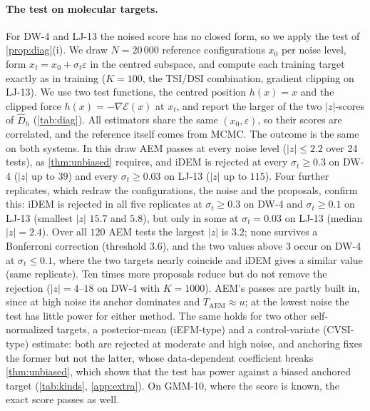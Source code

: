 \paragraph{The test on molecular targets.}
For DW-4 and LJ-13 the noised score has no closed form, so we apply the test of \cref{prop:diag}(i). We draw $N=20\,000$ reference configurations $x_0$ per noise level, form $x_t=x_0+\sigma_t\varepsilon$ in the centred subspace, and compute each training target exactly as in training ($K=100$, the TSI/DSI combination, gradient clipping on LJ-13). We use two test functions, the centred position $h(x)=x$ and the clipped force $h(x)=-\nabla\mathcal{E}(x)$ at $x_t$, and report the larger of the two $|z|$-scores of $\widehat D_h$ (\cref{tab:diag}). All estimators share the same $(x_0,\varepsilon)$, so their scores are correlated, and the reference itself comes from MCMC.
The outcome is the same on both systems. In this draw AEM passes at every noise level ($|z|\le2.2$ over 24 tests), as \cref{thm:unbiased} requires, and iDEM is rejected at every $\sigma_t\ge0.3$ on DW-4 ($|z|$ up to $39$) and every $\sigma_t\ge0.03$ on LJ-13 ($|z|$ up to $115$). Four further replicates, which redraw the configurations, the noise and the proposals, confirm this: iDEM is rejected in all five replicates at $\sigma_t\ge0.3$ on DW-4 and $\sigma_t\ge0.1$ on LJ-13 (smallest $|z|$ $15.7$ and $5.8$), but only in some at $\sigma_t=0.03$ on LJ-13 (median $|z|=2.4$). Over all $120$ AEM tests the largest $|z|$ is $3.2$; none survives a Bonferroni correction (threshold $3.6$), and the two values above $3$ occur on DW-4 at $\sigma_t\le0.1$, where the two targets nearly coincide and iDEM gives a similar value (same replicate).
Ten times more proposals reduce but do not remove the rejection ($|z|=4$--$18$ on DW-4 with $K=1000$). AEM's passes are partly built in, since at high noise its anchor dominates and $T_{\mathrm{AEM}}\approx u$; at the lowest noise the test has little power for either method. The same holds for two other self-normalized targets, a posterior-mean (iEFM-type) and a control-variate (CVSI-type) estimate: both are rejected at moderate and high noise, and anchoring fixes the former but not the latter, whose data-dependent coefficient breaks \cref{thm:unbiased}, which shows that the test has power against a biased anchored target (\cref{tab:kinds}, \cref{app:extra}). On GMM-10, where the score is known, the exact score passes as well.
